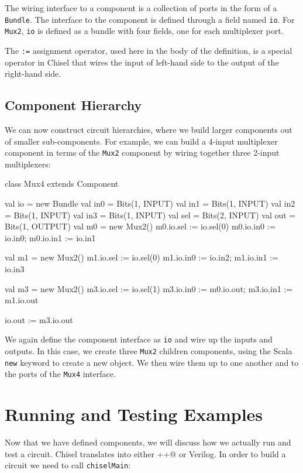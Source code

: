 \documentclass[twocolumn,10pt]{article}
\def\code#1{{\tt #1}}
\begin{document}
\noindent
The wiring interface to a component is a collection of ports in the
form of a \code{Bundle}.  The interface to the component is defined
through a field named \code{io}.  For \code{Mux2}, \code{io} is
defined as a bundle with four fields, one for each multiplexer port.

The \code{:=} assignment operator, used here in the body of the
definition, is a special operator in Chisel that wires the input of
left-hand side to the output of the right-hand side.

\subsection{Component Hierarchy}

We can now construct circuit hierarchies, where we build larger components out
of smaller sub-components.  For example, we can build a 4-input
multiplexer component in terms of the \code{Mux2} component by wiring
together three 2-input multiplexers:

\begin{scala}
class Mux4 extends Component {
  val io = new Bundle {
    val in0 = Bits(1, INPUT)
    val in1 = Bits(1, INPUT)
    val in2 = Bits(1, INPUT)
    val in3 = Bits(1, INPUT)
    val sel = Bits(2, INPUT)
    val out = Bits(1, OUTPUT)
  }
  val m0 = new Mux2()
  m0.io.sel := io.sel(0) 
  m0.io.in0 := io.in0; m0.io.in1 := io.in1

  val m1 = new Mux2()
  m1.io.sel := io.sel(0) 
  m1.io.in0 := io.in2; m1.io.in1 := io.in3

  val m3 = new Mux2()
  m3.io.sel := io.sel(1) 
  m3.io.in0 := m0.io.out; m3.io.in1 := m1.io.out

  io.out := m3.io.out
}
\end{scala}

\noindent
We again define the component interface as \code{io} and wire up the
inputs and outputs.  In this case, we create three \code{Mux2}
children components, using the Scala \code{new} keyword to create a
new object.  We then wire them up to one another and to the ports of
the \code{Mux4} interface.

\section{Running and Testing Examples}

Now that we have defined components, we will discuss how we actually run and test a circuit.  Chisel translates into either \verb@C++@ or Verilog.   In order to build a circuit we need to call \code{chiselMain}:
\end{document}
